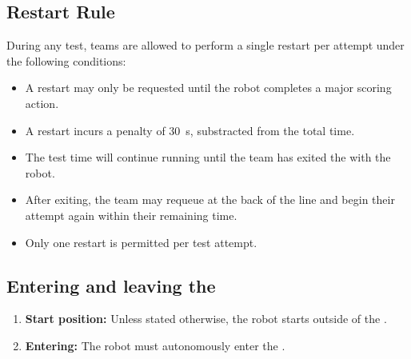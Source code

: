 \subsection{Restart Rule}
\label{rule:restart}

During any test, teams are allowed to perform a single restart per attempt under the following conditions:
\begin{itemize}
    \item A restart may only be requested until the robot completes a major scoring action.
    \item A restart incurs a penalty of \SI{30}{\second}, substracted from the total time.
    \item The test time will continue running until the team has exited the \Arena{} with the robot.
    \item After exiting, the team may requeue at the back of the line and begin their attempt again within their remaining time.
    \item Only one restart is permitted per test attempt.
\end{itemize}

\subsection{Entering and leaving the \Arena{}}
\label{rule:start_position}
\begin{enumerate}

	\item \textbf{Start position:} Unless stated otherwise, the robot starts outside of the \Arena{}.
	\item \textbf{Entering:} The robot must autonomously enter the \Arena{}.
\end{enumerate}



